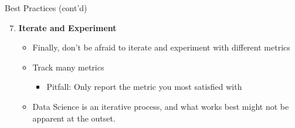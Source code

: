 \documentclass[aspectratio=169]{../latex_main/tntbeamer}  %
\begin{document}
        \begin{frame}[c]{Best Practices (cont'd)}
	    \begin{enumerate}\setcounter{enumi}{6}
                \item \textbf{Iterate and Experiment}
                \begin{itemize}
                    \item Finally, don't be afraid to iterate and experiment with different metrics
                    \item Track many metrics
                    \begin{itemize}
                        \item \alert{Pitfall:} Only report the metric you most satisfied with
                    \end{itemize}
                    \item Data Science is an iterative process, and what works best might not be apparent at the outset.
                \end{itemize}

	    \end{enumerate}

	\end{frame}
 
 
\end{document}
